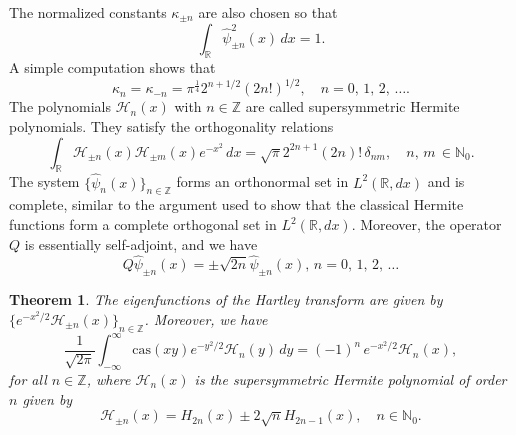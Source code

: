 \documentclass[12 pt]{amsart}
\numberwithin{equation}{section}
\newtheorem{theorem}{Theorem}[section]
\begin{document}
The normalized constants $\kappa_{\pm n}$ are also chosen so that
\begin{equation}
\int_{\mathbb{R}}\widehat{\psi}^2_{\pm n}(x)\,dx=1.
\end{equation}
A simple computation shows that
\begin{equation}
\kappa_{n}=\kappa_{-n}=\pi^{\frac{1}{4}}2^{n+1/2}(2n!)^{1/2},\quad n=0,\,1,\,2,\,\dots.
\end{equation}
The  polynomials $\mathcal{H}_{n}(x)$ with $ n\in \mathbb{Z}$ are called supersymmetric Hermite polynomials. They satisfy the orthogonality relations
\begin{equation}
\int_{\mathbb{R}}\mathcal{H}_{\pm n}(x)\mathcal{H}_{\pm m}(x)e^{-x^2}\,dx=\sqrt{\pi}2^{2n+1}(2n)
!\,\delta_{nm},\quad n,\,m\,\in \mathbb{N}_0.
\end{equation}
The system $\{\widehat{\psi}_n(x)\}_{n\in \mathbb{Z}}$ forms an orthonormal set in $L^2(\mathbb{R},dx)$ and is complete, similar to the argument used to show that the classical Hermite functions form a complete orthogonal set in $L^2(\mathbb{R},dx)$. Moreover, the operator $Q$ is essentially self-adjoint, and  we have \begin{equation}
Q\widehat{\psi}_{\pm n}(x)=\pm \sqrt{2n}\widehat{\psi}_{\pm n}(x),\,n=0,\,1,\,2,\,\dots
\end{equation}
\begin{theorem}
The eigenfunctions of the Hartley transform are given by $\{e^{-x^2/2}\mathcal{H}_{\pm n}(x)\}_{n\in \mathbb{Z}}$. Moreover, we have
\begin{equation*}
\frac{1}{\sqrt{2\pi}}\int_{-\infty}^\infty \text{cas}(xy)e^{-y^2/2}\mathcal{H}_{n}(y)\,dy=(-1)^n\, e^{-x^2/2}\mathcal{H}_{n}(x),
\end{equation*}
for all $n\in \mathbb{Z}$, where $\mathcal{H}_n(x)$ is the  supersymmetric Hermite polynomial of order $n$ given by \begin{equation*}\label{hers}
\mathcal{H}_{\pm n}(x)= H_{2n}(x)\pm 2 \sqrt{n} H_{2n-1}(x),\quad n\in \mathbb{N}_0.
\end{equation*}
\end{theorem}
\end{document}
